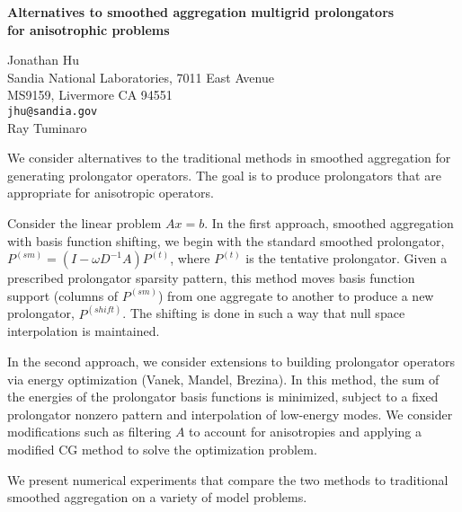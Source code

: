\documentclass{report}
\begin{document}

\begin{center}
{\large
{\bf Alternatives to smoothed aggregation multigrid prolongators \\
	for anisotrophic problems}}

	Jonathan Hu \\
	Sandia National Laboratories, 7011 East Avenue \\
	MS9159, Livermore CA 94551 \\
	{\tt jhu@sandia.gov} \\
	Ray Tuminaro
\end{center}
We consider alternatives to the traditional methods in
smoothed aggregation for generating prolongator operators.
The goal is to produce prolongators that are appropriate for
anisotropic operators.

Consider the linear problem
$Ax=b$. In the first approach, smoothed aggregation with
basis function shifting, we begin with the standard smoothed
prolongator,
$P^{(sm)} = (I - \omega D^{-1} A) P^{(t)}$,
where $P^{(t)}$ is the tentative prolongator.
Given a
prescribed prolongator sparsity pattern, this method moves
basis function support (columns of $P^{(sm)}$) from one
aggregate to another to produce a new prolongator,
$P^{(shift)}$.
The shifting is done in such a way that null
space interpolation is maintained.

In the second
approach, we consider extensions to building prolongator
operators via energy optimization (Vanek, Mandel, Brezina).
In this method, the sum of the energies of the prolongator
basis functions is minimized, subject to a fixed prolongator
nonzero pattern and interpolation of low-energy modes. We
consider modifications such as filtering $A$ to account for
anisotropies and applying a modified CG method to solve the
optimization problem.

We present numerical experiments
that compare the two methods to traditional smoothed
aggregation on a variety of model problems.



\end{document}
